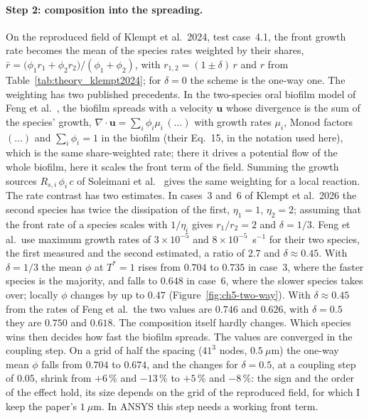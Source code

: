 \paragraph{Step 2: composition into the spreading.} On the reproduced field of
Klempt et al.\ 2024, test case~4.1, the front growth rate becomes
the mean of the species rates weighted by their shares,
$\bar r=\bigl(\phi_1r_1+\phi_2r_2\bigr)/(\phi_1+\phi_2)$, with
$r_{1,2}=(1\pm\delta)\,r$ and $r$ from Table~\ref{tab:theory_klempt2024}; for $\delta=0$ the scheme is the one-way one. The
weighting has two published precedents. In the two-species oral biofilm model
of Feng et al.~\cite{Feng2021SymbioticBiofilm}, the biofilm spreads with a
velocity $\mathbf u$ whose divergence is the sum of the species' growth,
$\nabla\cdot\mathbf u=\sum_i\phi_i\mu_i\,(\ldots)$ with growth rates $\mu_i$,
Monod factors $(\ldots)$ and $\sum_i\phi_i=1$ in the biofilm (their Eq.~15, in
the notation used here), which is the same share-weighted rate; there it
drives a potential flow of the whole biofilm, here it scales the front term of
the field. Summing the growth sources $R_{s,i}\,\phi_i\,c$ of Soleimani et
al.~\cite{Soleimani2023CoAggregation} gives the same weighting for a local
reaction. The rate contrast has two estimates. In cases~3 and~6 of Klempt et
al.\ 2026 the second species has twice the dissipation of the first,
$\eta_1=1$, $\eta_2=2$; assuming that the front rate of a species scales with
$1/\eta_i$ gives $r_1/r_2=2$ and $\delta=1/3$. Feng et al.\ use maximum growth rates
of $3\times10^{-5}$ and $8\times10^{-5}$~s$^{-1}$ for their two species, the
first measured and the second estimated, a ratio of $2.7$ and $\delta\approx0.45$. With $\delta=1/3$
the mean $\phi$ at $T^*=1$ rises from $0.704$ to $0.735$ in case~3, where the
faster species is the majority, and falls to $0.648$ in case~6, where the slower
species takes over; locally $\phi$ changes by up to $0.47$
(Figure~\ref{fig:ch5-two-way}). With $\delta\approx0.45$ from the rates of Feng et al.\ the
two values are $0.746$ and $0.626$, with $\delta=0.5$ they are $0.750$ and $0.618$. The composition itself hardly changes. Which
species wins then decides how fast the biofilm spreads. The values are
converged in the coupling step. On a grid of half the spacing ($41^3$ nodes,
$0.5~\mu$m) the one-way mean $\phi$ falls from $0.704$ to $0.674$, and the
changes for $\delta=0.5$, at a coupling step of $0.05$, shrink from $+6\,\%$ and $-13\,\%$ to $+5\,\%$ and
$-8\,\%$: the sign and the order of the effect hold, its size depends on the
grid of the reproduced field, for which I keep the paper's $1~\mu$m. In ANSYS
this step needs a working front term.

